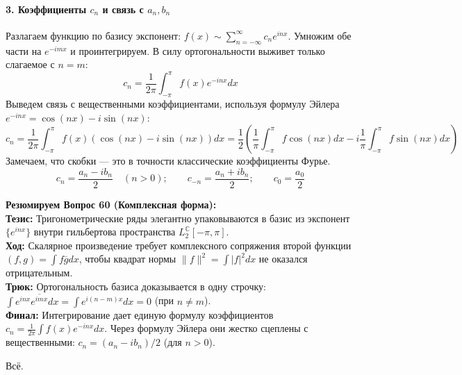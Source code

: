 \paragraph{3. Коэффициенты $c_n$ и связь с $a_n, b_n$}
Разлагаем функцию по базису экспонент: $f(x) \sim \sum_{n=-\infty}^\infty c_n e^{inx}$. Умножим обе части на $e^{-imx}$ и проинтегрируем. В силу ортогональности выживет только слагаемое с $n=m$:
$$ c_n = \frac{1}{2\pi} \int_{-\pi}^\pi f(x) e^{-inx} dx $$
Выведем связь с вещественными коэффициентами, используя формулу Эйлера $e^{-inx} = \cos(nx) - i \sin(nx)$:
$$ c_n = \frac{1}{2\pi} \int_{-\pi}^\pi f(x) (\cos(nx) - i \sin(nx)) dx = \frac{1}{2} \left( \frac{1}{\pi} \int_{-\pi}^\pi f \cos(nx)dx - i \frac{1}{\pi} \int_{-\pi}^\pi f \sin(nx)dx \right) $$
Замечаем, что скобки — это в точности классические коэффициенты Фурье. 
$$ c_n = \frac{a_n - i b_n}{2} \quad (n>0); \qquad c_{-n} = \frac{a_n + i b_n}{2}; \qquad c_0 = \frac{a_0}{2} $$
\begin{tcolorbox}[colback=gray!5, colframe=black, boxrule=0.5pt, arc=0pt]
\textbf{Резюмируем Вопрос 60 (Комплексная форма):} \\
\textbf{Тезис:} Тригонометрические ряды элегантно упаковываются в базис из экспонент $\{e^{inx}\}$ внутри гильбертова пространства $L_2^{\mathbb{C}}[-\pi, \pi]$. \\
\textbf{Ход:} Скалярное произведение требует комплексного сопряжения второй функции $(f,g) = \int f \overline{g} dx$, чтобы квадрат нормы $\|f\|^2 = \int |f|^2 dx$ не оказался отрицательным. \\
\textbf{Трюк:} Ортогональность базиса доказывается в одну строчку: $\int e^{inx} \overline{e^{imx}} dx = \int e^{i(n-m)x} dx = 0$ (при $n \ne m$). \\
\textbf{Финал:} Интегрирование дает единую формулу коэффициентов $c_n = \frac{1}{2\pi}\int f(x)e^{-inx}dx$. Через формулу Эйлера они жестко сцеплены с вещественными: $c_n = (a_n - i b_n)/2$ (для $n>0$).
\end{tcolorbox}

Всё.